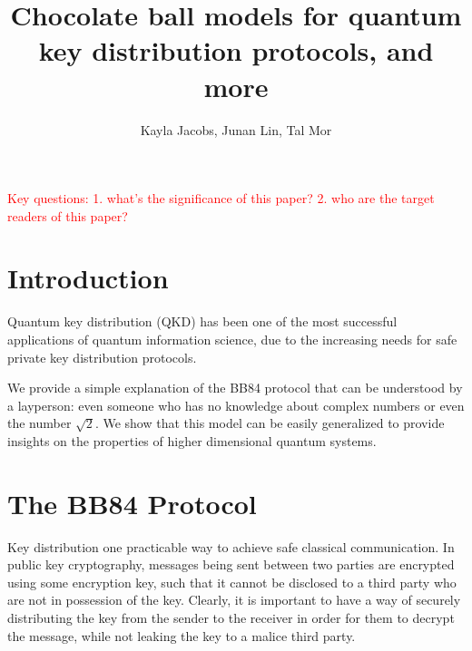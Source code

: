 \documentclass{article}
\def \todo #1{\textcolor{red}{#1}}
\begin{document}
\title{Chocolate ball models for quantum key distribution protocols, and more}
\author{Kayla Jacobs, Junan Lin, Tal Mor}
\date{}

\maketitle


\todo{Key questions: 1. what's the significance of this paper? 2. who are the target readers of this paper?}




\section{Introduction}
Quantum key distribution (QKD) has been one of the most successful applications of quantum information science, due to the increasing needs for safe private key distribution protocols.

We provide a simple explanation of the BB84 protocol that can be understood by a layperson: even someone who has no knowledge about complex numbers or even the number $\sqrt{2}$.
We show that this model can be easily generalized to provide insights on the properties of higher dimensional quantum systems.

\section{The BB84 Protocol}
Key distribution one practicable way to achieve safe classical communication.
In public key cryptography, messages being sent between two parties are encrypted using some encryption key, such that it cannot be disclosed to a third party who are not in possession of the key.
Clearly, it is important to have a way of securely distributing the key from the sender to the receiver in order for them to decrypt the message, while not leaking the key to a malice third party.
\end{document}
